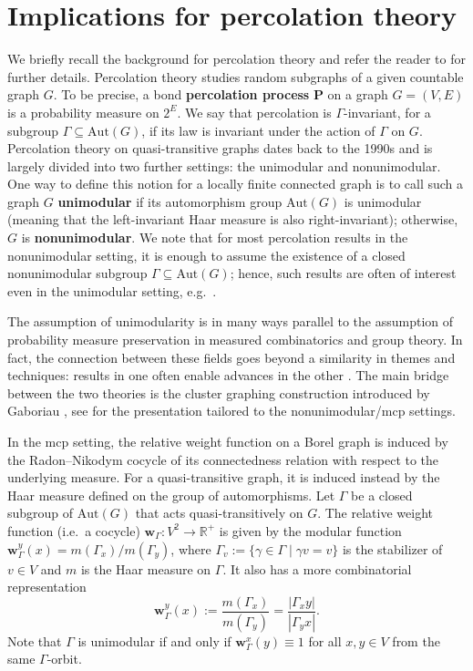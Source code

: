 \documentclass[letterpaper,11pt,reqno]{amsart}
\theoremstyle{bfnote}
\theoremstyle{definition}
\newcommand{\0}{\varnothing}
\newcommand{\R}{\mathbb{R}}
\newcommand{\Aut}{\mathrm{Aut}}
\newcommand{\w}{\mathbf{w}}
\newcommand{\abs}[1]{\left\vert#1\right\vert}
\numberwithin{equation}{section}
\begin{document}
\section{Implications for percolation theory}\label{sec:perc}
We briefly recall the background for percolation theory and refer the reader to \cite{LyonsBook,PetePGG} for further details. Percolation theory studies random subgraphs of a given countable graph $G$. To be precise, a bond \textbf{percolation process} $\mathbf{P}$ on a graph $G=(V,E)$ is a probability measure on $2^E$. We say that percolation is $\Gamma$-invariant, for a subgroup $\Gamma\subseteq \Aut(G)$, if its law is invariant under the action of $\Gamma$ on $G$. Percolation theory on quasi-transitive graphs dates back to the 1990s \cite{BSbeyond,Haggstrom99,BLPS99inv} and is largely divided into two further settings: the unimodular and nonunimodular. One way to define this notion for a locally finite connected graph is to call such a graph $G$ \textbf{unimodular} if its automorphism group $\mathrm{Aut}(G)$ is unimodular (meaning that the left-invariant Haar measure is also right-invariant); otherwise, $G$ is \textbf{nonunimodular}. We note that for most percolation results in the nonunimodular setting, it is enough to assume the existence of a closed nonunimodular subgroup $\Gamma\subseteq \Aut(G)$; hence, such results are often of interest even in the unimodular setting, e.g.\ \cite{Hutchcroft20}.

The assumption of unimodularity is in many ways parallel to the assumption of probability measure preservation in measured combinatorics and group theory. In fact, the connection between these fields goes beyond a similarity in themes and techniques: results in one often enable advances in the other \cite{Gaboriau05,GL09,CTT22,wamen,HeavyClusterRepulsion}. The main bridge between the two theories is the cluster graphing construction introduced by Gaboriau \cite[Section 2]{Gaboriau05}, see \cite[Section 5]{CTT22} for the presentation tailored to the nonunimodular/mcp settings. 

In the mcp setting, the relative weight function on a Borel graph is induced by the Radon–Nikodym cocycle of its connectedness relation with respect to the underlying measure. For a quasi-transitive graph, it is induced instead by the Haar measure defined on the group of automorphisms. Let $\Gamma$ be a closed subgroup of $\Aut(G)$ that acts quasi-transitively on $G$. The relative weight function (i.e.\ a cocycle) $\w_\Gamma:V^2\to\R^+$ is given by the modular function $\w^y_{\Gamma}(x)=m(\Gamma_x)/m(\Gamma_y)$, where $\Gamma_v := \{\gamma\in\Gamma \mid \gamma v=v\}$ is the stabilizer of $v\in V$ and $m$ is the Haar measure on $\Gamma$. It also has a more combinatorial representation \begin{equation}\label{def:haarweights} 
\w^y_{\Gamma}(x):=\frac{m(\Gamma_x)}{m(\Gamma_y)}=\frac{\abs{\Gamma_x y}}{\abs{\Gamma_y x}}.
\end{equation}
Note that $\Gamma$ is unimodular if and only if $\w_\Gamma^x(y)\equiv 1$ for all $x, y \in V$ from the same $\Gamma$-orbit. 
\end{document}
